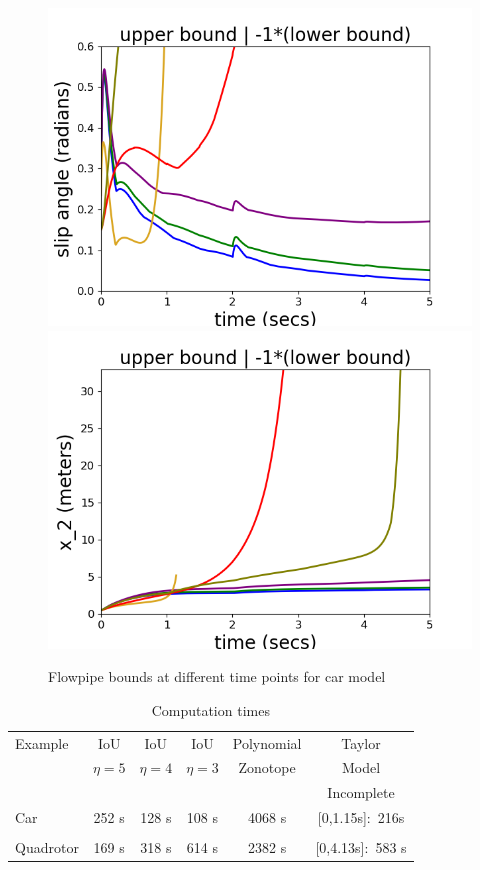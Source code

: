\begin{figure}
\includegraphics[scale = 0.41]{autocarImages/ubToolSlip.png}\hspace{-2.2em}
\includegraphics[scale = 0.41]{autocarImages/ubToolx2.png}
  \caption{Flowpipe bounds at different time points for
    car model}\label{fig:flowcar}
\end{figure}
%
%
\begin{table}
\caption{Computation times}\label{tab:comptimes}
\begin{tabular}{|l|c|c|c|c|c|}
\hline
Example & IoU  & IoU  & IoU  &
Polynomial & Taylor\\
& $\eta = 5$ & $\eta = 4$ & $\eta = 3$ & Zonotope & Model \\
\hline
& & & & & {\color{red}Incomplete}\\
Car & 252 s & 128 s & 108 s & 4068 s& {\color{red}[0,1.15s]:~216s}\\
\hline
& & & & &\\
Quadrotor & 169 s & 318 s & 614 s & 2382 s &
{\color{red}[0,4.13s]:~583 s} \\
\hline
\end{tabular}
\end{table}
%
